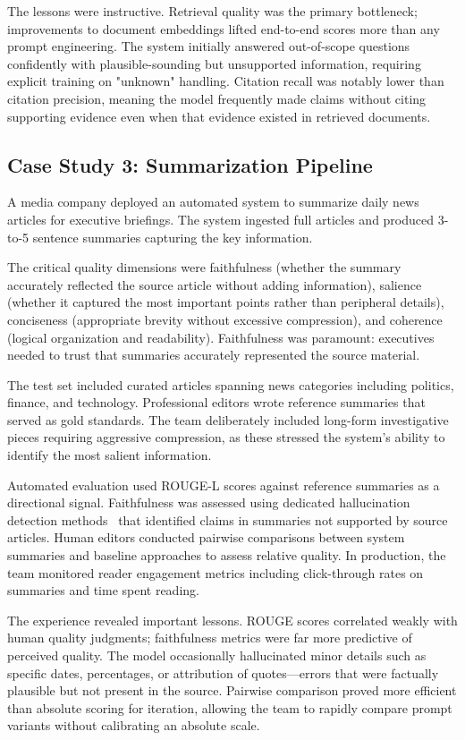 The lessons were instructive. Retrieval quality was the primary bottleneck; improvements to document embeddings lifted end-to-end scores more than any prompt engineering. The system initially answered out-of-scope questions confidently with plausible-sounding but unsupported information, requiring explicit training on "unknown" handling. Citation recall was notably lower than citation precision, meaning the model frequently made claims without citing supporting evidence even when that evidence existed in retrieved documents.

\subsection{Case Study 3: Summarization Pipeline}

A media company deployed an automated system to summarize daily news articles for executive briefings. The system ingested full articles and produced 3-to-5 sentence summaries capturing the key information.

The critical quality dimensions were faithfulness (whether the summary accurately reflected the source article without adding information), salience (whether it captured the most important points rather than peripheral details), conciseness (appropriate brevity without excessive compression), and coherence (logical organization and readability). Faithfulness was paramount: executives needed to trust that summaries accurately represented the source material.

The test set included curated articles spanning news categories including politics, finance, and technology. Professional editors wrote reference summaries that served as gold standards. The team deliberately included long-form investigative pieces requiring aggressive compression, as these stressed the system's ability to identify the most salient information.

Automated evaluation used ROUGE-L scores against reference summaries as a directional signal. Faithfulness was assessed using dedicated hallucination detection methods~\citep{maynez2020faithfulness} that identified claims in summaries not supported by source articles. Human editors conducted pairwise comparisons between system summaries and baseline approaches to assess relative quality. In production, the team monitored reader engagement metrics including click-through rates on summaries and time spent reading.

The experience revealed important lessons. ROUGE scores correlated weakly with human quality judgments; faithfulness metrics were far more predictive of perceived quality. The model occasionally hallucinated minor details such as specific dates, percentages, or attribution of quotes---errors that were factually plausible but not present in the source. Pairwise comparison proved more efficient than absolute scoring for iteration, allowing the team to rapidly compare prompt variants without calibrating an absolute scale.

